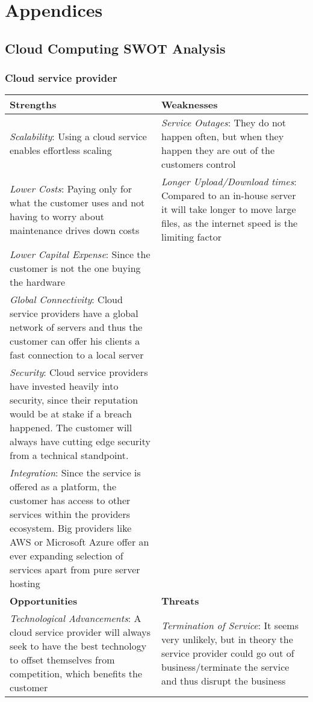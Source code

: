 \section{Appendices}
\subsection{Cloud Computing SWOT Analysis}

\subsubsection{Cloud service provider}

\renewcommand{\arraystretch}{1.5}
\begin{center}
\begin{tabular}{ | p{0.5\linewidth} | p{0.5\linewidth} | } 
 \hline
 \textbf{Strengths} & \textbf{Weaknesses}\\ 
\hline
 \textit{Scalability}: Using a cloud service enables effortless scaling & \textit{Service Outages}: They do not happen often, but when they happen they are out of the customers control \\ 
\textit{Lower Costs}: Paying only for what the customer uses and not having to worry about maintenance drives down costs & \textit{Longer Upload/Download times}:  Compared to an in-house server it will take longer to move large files, as the internet speed is the limiting factor\\
\textit{Lower Capital Expense}: Since the customer is not the one buying the hardware & \\ 
 \textit{Global Connectivity}: Cloud service providers have a global network of servers and thus the customer can offer his clients a fast connection to a local server & \\
 \textit{Security}: Cloud service providers have invested heavily into security, since their reputation would be at stake if a breach happened. The customer will always have cutting edge security from a technical standpoint. & \\
 \textit{Integration}: Since the service is offered as a platform, the customer has access to other services within the providers ecosystem. Big providers like AWS or Microsoft Azure offer an ever expanding selection of services apart from pure server hosting & \\
 \hline
 \textbf{Opportunities} & \textbf{Threats}  \\ 
 \hline
\textit{Technological Advancements}: A cloud service provider will always seek to have the best technology to offset themselves from competition, which benefits the customer & \textit{Termination of Service}: It seems very unlikely, but in theory the service provider could go out of business/terminate the service and thus disrupt the business \\
\hline 
\end{tabular}
\end{center}


